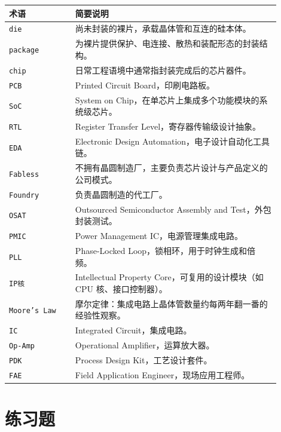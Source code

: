 \documentclass[11pt,a4paper]{article}
\begin{document}
\begin{center}
\begin{tabular}{p{0.22\linewidth} p{0.68\linewidth}}
\toprule
术语 & 简要说明 \\
\midrule
\texttt{die} & 尚未封装的裸片，承载晶体管和互连的硅本体。 \\
\texttt{package} & 为裸片提供保护、电连接、散热和装配形态的封装结构。 \\
\texttt{chip} & 日常工程语境中通常指封装完成后的芯片器件。 \\
\texttt{PCB} & Printed Circuit Board，印刷电路板。 \\
\texttt{SoC} & System on Chip，在单芯片上集成多个功能模块的系统级芯片。 \\
\texttt{RTL} & Register Transfer Level，寄存器传输级设计抽象。 \\
\texttt{EDA} & Electronic Design Automation，电子设计自动化工具链。 \\
\texttt{Fabless} & 不拥有晶圆制造厂，主要负责芯片设计与产品定义的公司模式。 \\
\texttt{Foundry} & 负责晶圆制造的代工厂。 \\
\texttt{OSAT} & Outsourced Semiconductor Assembly and Test，外包封装测试。 \\
\texttt{PMIC} & Power Management IC，电源管理集成电路。 \\
\texttt{PLL} & Phase-Locked Loop，锁相环，用于时钟生成和倍频。 \\
\texttt{IP核} & Intellectual Property Core，可复用的设计模块（如 CPU 核、接口控制器）。 \\
\texttt{Moore's Law} & 摩尔定律：集成电路上晶体管数量约每两年翻一番的经验性观察。 \\
\texttt{IC} & Integrated Circuit，集成电路。 \\
\texttt{Op-Amp} & Operational Amplifier，运算放大器。 \\
\texttt{PDK} & Process Design Kit，工艺设计套件。 \\
\texttt{FAE} & Field Application Engineer，现场应用工程师。 \\
\bottomrule
\end{tabular}
\end{center}

\section{练习题}
\end{document}
